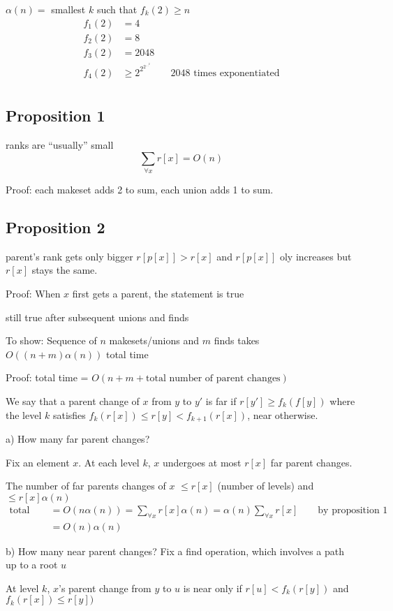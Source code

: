 \documentclass[english,12pt]{article}
\theoremstyle{plain}
\theoremstyle{definition}
\theoremstyle{definition} %
\begin{document}
$\alpha(n)=$ smallest $k$ such that $f_k(2)\ge n$
\begin{align*}
f_1(2)&=4\\
f_2(2)&=8\\
f_3(2)&=2048\\
f_4(2)&\ge 2^{2^{2^{\ldots^2}}}\qquad 2048\text{ times exponentiated}\\
\end{align*}

\subsection{Proposition 1}
ranks are ``usually'' small
\[\sum_{\forall x}r[x] = O(n)\]

Proof: each makeset adds 2 to sum, each union adds 1 to sum.

\subsection{Proposition 2}
parent's rank gets only bigger
$r[p[x]]>r[x]$ and $r[p[x]]$ oly increases but $r[x]$ stays the same.

Proof: When $x$ first gets a parent, the statement is true

still true after subsequent unions and finds

To show: Sequence of $n$ makesets/unions and $m$ finds takes $O((n+m)\alpha(n))$ total time

Proof: total time = $O(n+m+\text{total number of parent changes})$

We say that a parent change of $x$ from $y$ to $y'$ is far if $r[y']\ge f_k(f[y])$ where the level $k$ satisfies $f_k(r[x])\le r[y]<f_{k+1}(r[x])$, near otherwise.

a) How many far parent changes?

Fix an element $x$.  At each level $k$, $x$ undergoes at most $r[x]$ far parent changes.

The number of far parents changes of $x$ $\le r[x]$ (number of levels) and $\le r[x]\alpha(n)$
\begin{align*}
\text{total number}&= O(n\alpha(n))
=\sum_{\forall x}r[x]\alpha(n)
=\alpha(n)\sum_{\forall x} r[x] \qquad \text{by proposition 1}\\
&= O(n)\alpha (n)
\end{align*}

b) How many near parent changes?
Fix a find operation, which involves a path up to a root $u$

At level $k$, $x$'s parent change from $y$ to $u$ is near only if $r[u] < f_k(r[y])$ and $f_k(r[x])\le r[y])$
\end{document}
